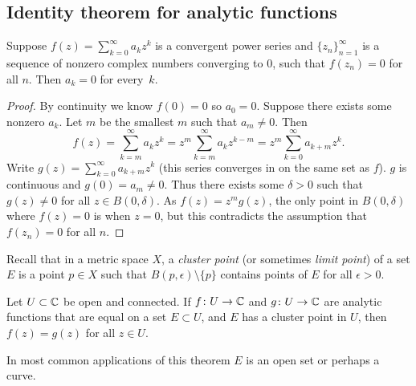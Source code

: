 \subsection{Identity theorem for analytic functions}

\begin{lemma}
Suppose $f(z) = \sum_{k=0}^\infty a_k z^k$ is a convergent power series and
$\{ z_n \}_{n=1}^\infty$ is a sequence of nonzero complex numbers converging to 0,
such that $f(z_n) = 0$ for all $n$.  Then $a_k = 0$ for every~$k$.
\end{lemma}

\begin{proof}
By continuity we know $f(0) = 0$ so $a_0 = 0$.
Suppose there exists some nonzero $a_k$.
Let $m$ be the smallest $m$ such that $a_m \not= 0$.  Then
\begin{equation*}
f(z) = \sum_{k=m}^\infty a_k z^k = 
z^m \sum_{k=m}^\infty a_k z^{k-m} =
z^m \sum_{k=0}^\infty a_{k+m} z^{k} .
\end{equation*}
Write $g(z) = \sum_{k=0}^\infty a_{k+m} z^{k}$ (this series converges in
on the same set as $f$).  $g$ is continuous and $g(0) = a_m \not= 0$.  Thus
there exists some $\delta > 0$ such that $g(z) \not= 0$ for all $z \in
B(0,\delta)$.  As $f(z) = z^m g(z)$, the only point in $B(0,\delta)$ where
$f(z) = 0$ is when $z=0$, but this contradicts the assumption
that $f(z_n) = 0$ for all $n$.
\end{proof}

Recall that in a metric space $X$, a \emph{cluster point}
(or sometimes \emph{limit point}) of a set
$E$ is a point $p \in X$ such that
$B(p,\epsilon) \setminus \{ p \}$ contains points of $E$
for all $\epsilon > 0$.

\begin{thm}
\label{thm:identityanalytic}%
%
Let $U \subset {\mathbb{C}}$ be open and connected.  If $f \colon U \to {\mathbb{C}}$
and $g \colon U \to {\mathbb{C}}$ are analytic functions that are
equal on a set $E \subset U$, and $E$ has a cluster point
in $U$, then $f(z) = g(z)$ for all $z \in U$.
\end{thm}

In most common applications of this theorem $E$ is an open set or perhaps a curve.

